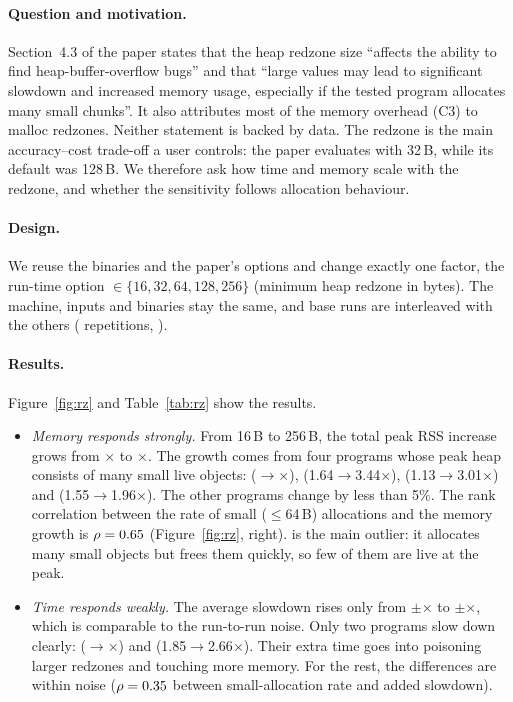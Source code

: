 \paragraph{Question and motivation.}
Section~4.3 of the paper states that the heap redzone size ``affects the
ability to find heap-buffer-overflow bugs'' and that ``large values may lead
to significant slowdown and increased memory usage, especially if the tested
program allocates many small chunks''. It also attributes most of the memory
overhead (C3) to malloc redzones. Neither statement is backed by data. The
redzone is the main accuracy--cost trade-off a user controls: the paper
evaluates with 32\,B, while its default was 128\,B. We therefore ask how time
and memory scale with the redzone, and whether the sensitivity follows
allocation behaviour.

\paragraph{Design.}
We reuse the  binaries and the paper's options and change exactly
one factor, the run-time option $\in\{16,32,64,128,256\}$
(minimum heap redzone in bytes). The machine, inputs and binaries stay the
same, and base runs are interleaved with the others (\RzRuns{} repetitions,
).

\paragraph{Results.}
Figure~\ref{fig:rz} and Table~\ref{tab:rz} show the results.
\begin{itemize}
\item \emph{Memory responds strongly.} From 16\,B to 256\,B, the total peak
RSS increase grows from \RzMsixteen$\times$ to \RzMtwofiftysix$\times$. The
growth comes from four programs whose peak heap consists of many small live
objects:  (\RzMemMostsixteen$\rightarrow$\RzMemMosttwofiftysix$\times$),
 (1.64$\rightarrow$3.44$\times$), 
(1.13$\rightarrow$3.01$\times$) and  (1.55$\rightarrow$1.96$\times$).
The other \RzMemFlat{} programs change by less than 5\%. The rank correlation
between the rate of small ($\le$64\,B) allocations and the memory growth is
$\rho=0.65$ (Figure~\ref{fig:rz}, right).  is the main
outlier: it allocates many small objects but frees them quickly, so few of
them are live at the peak.
\item \emph{Time responds weakly.} The average slowdown rises only from
\RzTsixteen$\pm$\RzTsixteensd$\times$ to
\RzTtwofiftysix$\pm$\RzTtwofiftysixsd$\times$, which is comparable to the
run-to-run noise. Only two programs slow down clearly: 
(\RzMostTsixteen$\rightarrow$\RzMostTtwofiftysix$\times$) and 
(1.85$\rightarrow$2.66$\times$). Their extra time goes into poisoning larger
redzones and touching more memory. For the rest, the differences are within
noise ($\rho=0.35$ between small-allocation rate and added slowdown).
\end{itemize}


